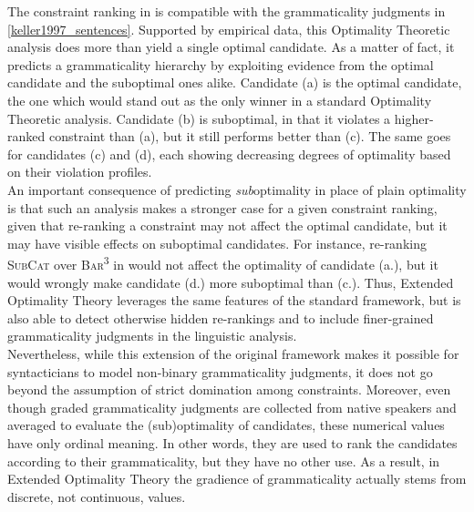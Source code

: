 The constraint ranking in  is compatible with the grammaticality judgments in \ref{keller1997_sentences}. Supported by empirical data, this Optimality Theoretic analysis does more than yield a single optimal candidate. As a matter of fact, it predicts a grammaticality hierarchy by exploiting evidence from the optimal candidate and the suboptimal ones alike. Candidate (a) is the optimal candidate, the one which would stand out as the only winner in a standard Optimality Theoretic analysis. Candidate (b) is suboptimal, in that it violates a higher-ranked constraint than (a), but it still performs better than (c). The same goes for candidates (c) and (d), each showing decreasing degrees of optimality based on their violation profiles.\\
An important consequence of predicting \textit{sub}optimality in place of plain optimality is that such an analysis makes a stronger case for a given constraint ranking, given that re-ranking a constraint may not affect the optimal candidate, but it may have visible effects on suboptimal candidates. For instance, re-ranking \textsc{SubCat} over \textsc{Bar\textsuperscript{3}} in  would not affect the optimality of candidate (a.), but it would wrongly make candidate (d.) more suboptimal than (c.). Thus, Extended Optimality Theory leverages the same features of the standard framework, but is also able to detect otherwise hidden re-rankings and to include finer-grained grammaticality judgments in the linguistic analysis.\\
Nevertheless, while this extension of the original framework makes it possible for syntacticians to model non-binary grammaticality judgments, it does not go beyond the assumption of strict domination among constraints. Moreover, even though graded grammaticality judgments are collected from native speakers and averaged to evaluate the (sub)optimality of candidates, these numerical values have only ordinal meaning. In other words, they are used to rank the candidates according to their grammaticality, but they have no other use. As a result, in Extended Optimality Theory the gradience of grammaticality actually stems from discrete, not continuous, values.

